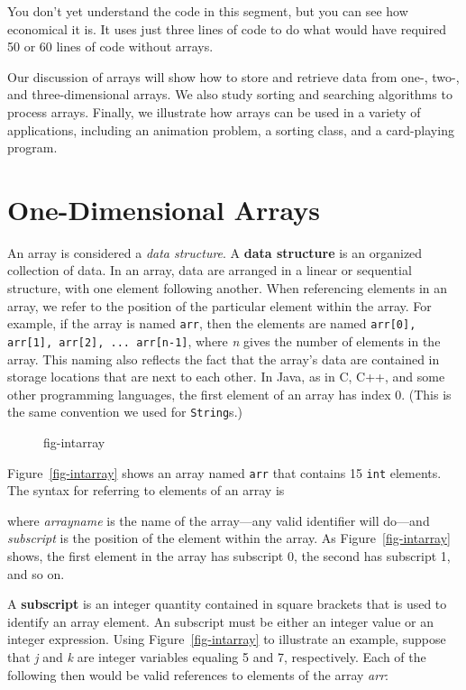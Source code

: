 \noindent You don't yet understand the code in this segment, but you can
see how economical it is. It uses just three lines of code to do what
would have required 50 or 60 lines of code without arrays. 

Our discussion of arrays will show how to store and retrieve data from
one-, two-, and three-dimensional arrays.  We also study sorting and
searching algorithms to process arrays. Finally, we illustrate how
arrays can be used in a variety of applications, including an
animation problem, a sorting class, and a card-playing \mbox{program.}

\section{One-Dimensional Arrays}

\noindent An array is considered a {\em data structure}. A {\bf data
structure} is an organized collection of data. In an array, data are
arranged  in a linear or
sequential structure, with one element following another.  When
referencing elements in an array, we refer to the position of the
particular element within the array. For example, if the array is
named {\tt arr}, then the elements are named
\verb|arr[0], arr[1], arr[2], ... arr[n-1]|, where {\it n} gives the
number of elements in the array.  This naming also reflects the fact
that the array's data are contained in storage locations that are next
to each other. In Java, as in C, C++, and some other programming
languages, the first element of an array has index 0.
(This is the same convention we used for {\tt String}s.)

\begin{figure}[h!]
{fig-intarray}
\end{figure}
Figure~\ref{fig-intarray} shows an array named {\tt arr} that
contains 15 {\tt int} elements.  
The syntax for referring to elements of an array is


\noindent where {\it arrayname} is the name of the array---any valid
identifier will do---and {\it subscript} is the position of the
element within the array. As Figure~\ref{fig-intarray} shows, the
first element in the array has subscript 0, the second has subscript
1, and so on.


A {\bf subscript} is an integer quantity contained in square brackets
that is used to identify an array element. An subscript must be
either an integer value or an integer
expression.  Using Figure~\ref{fig-intarray} to illustrate an example,
suppose that {\it j} and {\it k} are integer variables equaling 5 and
7, respectively.  Each of the following then would be valid references
to elements of the array {\it arr}:

